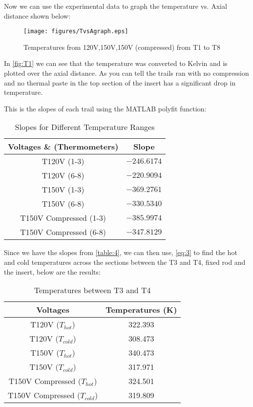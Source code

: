 \documentclass[10pt,twocolumn]{article}
\begin{document}
Now we can use the experimental data to graph the temperature vs. Axial distance shown below:

\begin{figure}[H]
  \centering
  \texttt{[image: figures/TvsAgraph.eps]} 
  \caption{Temperatures from 120V,150V,150V (compressed) from T1 to T8}
  \label{fig:T1}
\end{figure}
 
In \autoref{fig:T1} we can see that the temperature was converted to Kelvin and is plotted over the axial distance. As you can tell the trails ran with no compression and no thermal paste in the top section of the insert has a significant drop in temperature.

This is the slopes of each trail using the MATLAB polyfit function:

\begin{table}[H]
\centering
\caption{Slopes for Different Temperature Ranges}

\begin{tabular}{|c|c|}
\hline
\textbf{Voltages \& (Thermometers)} & \textbf{Slope} \\
\hline
T120V (1-3) & $-246.6174$ \\
\hline
T120V (6-8) & $-220.9094$ \\
\hline
T150V (1-3) & $-369.2761$ \\
\hline
T150V (6-8) & $-330.5340$ \\
\hline
T150V Compressed (1-3) & $-385.9974$ \\
\hline
T150V Compressed (6-8) & $-347.8129$ \\
\hline
\end{tabular}
\label{table:4}
\end{table}


Since we have the slopes from \autoref{table:4}, we can then use, \autoref{eq:3} to find the hot and cold temperatures across the sections between the T3 and T4, fixed rod and the insert, below are the results:

\begin{table}[H]
\centering
\caption{Temperatures between T3 and T4 }
\begin{tabular}{|c|c|}
\hline
\textbf{Voltages}  & \textbf{Temperatures (K)} \\
\hline
T120V ($T_{hot}$) & 322.393 \\
\hline
T120V ($T_{cold}$) & 308.473 \\
\hline
T150V ($T_{hot}$) & 340.473 \\
\hline
T150V ($T_{cold}$) & 317.971 \\
\hline
T150V Compressed ($T_{hot}$) & 324.501 \\
\hline
T150V Compressed ($T_{cold}$) & 319.809 \\
\hline
\end{tabular}
\label{Tab:5}
\end{table}
\end{document}
